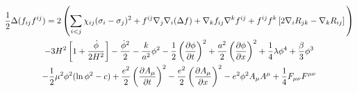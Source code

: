 \begin{multline}
    \frac{1}{2} \Delta (f_{ij} f^{ij}) =
    2 \left(\sum_{i<j} \chi_{ij}(\sigma_{i} - \sigma_{j})^{2}
    + f^{ij} \nabla_{j} \nabla_{i} (\Delta f)  + \nabla_{k} f_{ij} \nabla^{k} f^{ij} +
    f^{ij} f^{k} \left[2\nabla_{i}R_{jk}- \nabla_{k} R_{ij} \right] \vphantom{\sum_{i<j}} \right) \\
    - 3H^{2}\left[1+\frac{\dot{\phi}}{2H^2}\right] - \frac{\dot{\phi}^{2}}{2} - \frac{k}{a^{2}}\phi^{2} - \frac{1}{2}\left(\frac{\partial\phi}{\partial t}\right)^{2} + \frac{a^2}{2}\left(\frac{\partial\phi}{\partial x}\right)^{2}
    + \frac{1}{4}\lambda\phi^{4} + \frac{\beta}{3}\phi^{3} \\
    -\frac{1}{2}\mu^{2}\phi^{2}(\ln{\phi^{2}} - c)
    + \frac{e^{2}}{2}\left(\frac{\partial A_{\mu}}{\partial t}\right)^{2} - \frac{e^{2}}{2}\left(\frac{\partial A_{\mu}}{\partial x}\right)^{2}
    - e^{2}\phi^{2}A_{\mu}A^{\mu} + \frac{1}{4}F_{\mu\nu}F^{\mu\nu}
\end{multline}